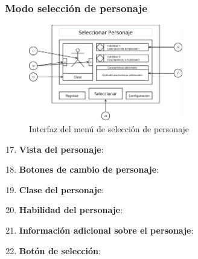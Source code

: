 \subsubsection{Modo selección de personaje}
\begin{figure}[H]
    \centering
    \includegraphics[width=0.6\textwidth]{5-Cuerpo/Chapter5/I5.png} %
    \caption{Interfaz del menú de selección de personaje}
    \label{fig:Interface_Seleccion_Personaje}
\end{figure}
\begin{enumerate}\setcounter{enumi}{16}
    \item \textbf{Vista del personaje}:
    \item \textbf{Botones de cambio de personaje}:
    \item \textbf{Clase del personaje}:
    \item \textbf{Habilidad del personaje}:
    \item \textbf{Información adicional sobre el personaje}:
    \item \textbf{Botón de selección}:
\end{enumerate}

